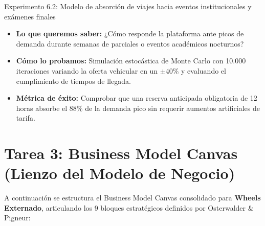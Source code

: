 \documentclass[11pt,a4paper]{article}
\begin{document}
\begin{kbibox}{Experimento 6.2: Modelo de absorción de viajes hacia eventos institucionales y exámenes finales}
\begin{itemize}[leftmargin=*]
    \item \textbf{Lo que queremos saber:} ¿Cómo responde la plataforma ante picos de demanda durante semanas de parciales o eventos académicos nocturnos?
    \item \textbf{Cómo lo probamos:} Simulación estocástica de Monte Carlo con 10.000 iteraciones variando la oferta vehicular en un $\pm 40\%$ y evaluando el cumplimiento de tiempos de llegada.
    \item \textbf{Métrica de éxito:} Comprobar que una reserva anticipada obligatoria de 12 horas absorbe el 88\% de la demanda pico sin requerir aumentos artificiales de tarifa.
\end{itemize}
\end{kbibox}

\newpage
\section{Tarea 3: Business Model Canvas (Lienzo del Modelo de Negocio)}

A continuación se estructura el Business Model Canvas consolidado para \textbf{Wheels Externado}, articulando los 9 bloques estratégicos definidos por Osterwalder \& Pigneur:
\end{document}
